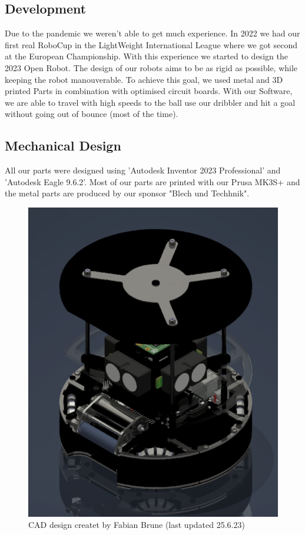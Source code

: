 \documentclass{scrartcl}
\begin{document}
\subsection{Development}
Due to the pandemic we weren't able to get much experience. In 2022 we had our first real RoboCup
in the LightWeight International League where we got second at the European Championship. With this experience we started to design the 2023 Open Robot.
\newline
The design of our robots aims to be as rigid as possible, while keeping the robot manouverable.
To achieve this goal, we used metal and 3D printed Parts in combination with optimised circuit boards.
With our Software, we are able to travel with high speeds to the ball use our dribbler and
hit a goal without going out of bounce (most of the time).


\subsection{Mechanical Design}
All our parts were designed using 'Autodesk Inventor 2023 Professional' and 'Autodesk Eagle 9.6.2'.
Most of our parts are printed with our Prusa MK3S+ and the metal parts are produced
by our sponsor "Blech und Techhnik".

\begin{figure}[h]
    \centering
    \includegraphics[width=\textwidth]{img/Roboter Home.png}
    \caption{CAD design createt by Fabian Brune (last updated 25.6.23)}
    \label{fig:roboter}
\end{figure}
\end{document}
